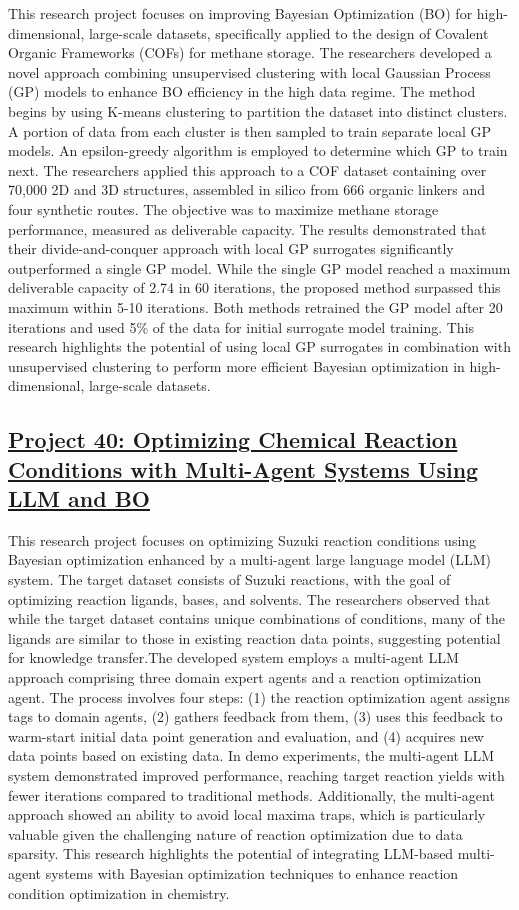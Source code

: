 This research project focuses on improving Bayesian Optimization (BO) for high-dimensional, large-scale datasets, specifically applied to the design of Covalent Organic Frameworks (COFs) for methane storage\cite{deshwal_bayesian_2021}. The researchers developed a novel approach combining unsupervised clustering with local Gaussian Process (GP) models to enhance BO efficiency in the high data regime. The method begins by using K-means clustering to partition the dataset into distinct clusters. A portion of data from each cluster is then sampled to train separate local GP models. An epsilon-greedy algorithm is employed to determine which GP to train next. The researchers applied this approach to a COF dataset containing over 70,000 2D and 3D structures, assembled in silico from 666 organic linkers and four synthetic routes. The objective was to maximize methane storage performance, measured as deliverable capacity. The results demonstrated that their divide-and-conquer approach with local GP surrogates significantly outperformed a single GP model. While the single GP model reached a maximum deliverable capacity of 2.74 in 60 iterations, the proposed method surpassed this maximum within 5-10 iterations. Both methods retrained the GP model after 20 iterations and used 5\% of the data for initial surrogate model training. This research highlights the potential of using local GP surrogates in combination with unsupervised clustering to perform more efficient Bayesian optimization in high-dimensional, large-scale datasets.
 \subsection*{\href{https://x.com/Bozhao95501764/status/1777029207857451508}{Project 40: Optimizing Chemical Reaction Conditions with Multi-Agent Systems Using LLM and BO}}

This research project focuses on optimizing Suzuki reaction conditions using Bayesian optimization enhanced by a multi-agent large language model (LLM) system. The target dataset consists of Suzuki reactions, with the goal of optimizing reaction ligands, bases, and solvents. The researchers observed that while the target dataset contains unique combinations of conditions, many of the ligands are similar to those in existing reaction data points, suggesting potential for knowledge transfer.The developed system employs a multi-agent LLM approach comprising three domain expert agents and a reaction optimization agent. The process involves four steps: (1) the reaction optimization agent assigns tags to domain agents, (2) gathers feedback from them, (3) uses this feedback to warm-start initial data point generation and evaluation, and (4) acquires new data points based on existing data. In demo experiments, the multi-agent LLM system demonstrated improved performance, reaching target reaction yields with fewer iterations compared to traditional methods. Additionally, the multi-agent approach showed an ability to avoid local maxima traps, which is particularly valuable given the challenging nature of reaction optimization due to data sparsity. This research highlights the potential of integrating LLM-based multi-agent systems with Bayesian optimization techniques to enhance reaction condition optimization in chemistry.

